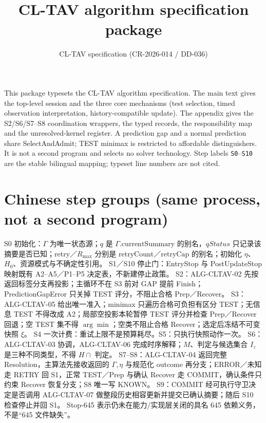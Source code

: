 \documentclass[11pt]{article}
\title{CL-TAV algorithm specification package}
\author{CL-TAV specification (CR-2026-014 / DD-036)}
\date{}
\begin{document}
\maketitle
\noindent This package typesets the CL-TAV algorithm specification. The main
text gives the top-level session and the three core mechanisms (test selection,
timed observation interpretation, history-compatible update). The appendix gives
the S2/S6/S7--S8 coordination wrappers, the typed records, the responsibility map
and the unresolved-kernel register. A prediction gap and a normal prediction share
SelectAndAdmit; TEST minimax is restricted to affordable distinguishers. It is not
a second program and selects no solver technology. Step labels \texttt{S0}--\texttt{S10}
are the stable bilingual mapping; typeset line numbers are not cited.










\section*{Chinese step groups (same process, not a second program)}
S0 初始化：$\Gamma$ 为唯一状态源；$q$ 是 $\Gamma.\mathrm{currentSummary}$ 的别名，$qStatus$ 只记录该摘要是否已知；retry／$R_{\max}$ 分别是 $\mathrm{retryCount}$／$\mathrm{retryCap}$ 的别名；初始化 $\eta$、$H_0$、资源模式与不确定性引用。
S1／S10 停止门：EntryStop 与 PostUpdateStop 映射既有 A2--A5／P1--P5 决定表，不新建停止政策。
S2：ALG-CLTAV-02 先按返回标签分支再投影；主循环不在 S3 前对 GAP 提前 Finish；PredictionGapError 只关掉 TEST 评分，不阻止合格 Prep／Recover。
S3：ALG-CLTAV-05 给出唯一准入；minimax 只遍历合格可负担有区分 TEST；无信息 TEST 不得改成 A2；局部空投影本轮暂停 TEST 评分并检查 Prep／Recover 回退；空 TEST 集不得 $\arg\min$；空类不阻止合格 Recover；选定后冻结不可变快照 $\xi$。
S4 一次计费：重试上限不是预算耗尽。S5：只执行快照动作一次。
S6：ALG-CLTAV-03 协调，ALG-CLTAV-06 完成时序解释；$M$、判定与候选集合 $I_z$ 是三种不同类型，不得 $H\cap$ 判定。
S7--S8：ALG-CLTAV-04 返回完整 Resolution，主算法先接收返回的 $\Gamma,\eta$ 与规范化 outcome 再分支；ERROR／未知走 RETRY 回 S1，正常 TEST／Prep 与确认 Recover 走 COMMIT，确认条件只约束 Recover 恢复分支；S8 唯一写 KNOWN。
S9：COMMIT 经可执行守卫决定是否调用 ALG-CLTAV-07 做整段历史相容更新并提交已确认摘要；随后 S10 检查停止并回 S1。
Stop-645 表示仍未在能力/实现层关闭的具名 645 依赖义务，不是“645 文件缺失”。
\end{document}
